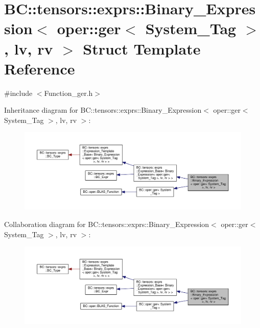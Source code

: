 \hypertarget{structBC_1_1tensors_1_1exprs_1_1Binary__Expression_3_01oper_1_1ger_3_01System__Tag_01_4_00_01lv_00_01rv_01_4}{}\section{BC\+:\+:tensors\+:\+:exprs\+:\+:Binary\+\_\+\+Expression$<$ oper\+:\+:ger$<$ System\+\_\+\+Tag $>$, lv, rv $>$ Struct Template Reference}
\label{structBC_1_1tensors_1_1exprs_1_1Binary__Expression_3_01oper_1_1ger_3_01System__Tag_01_4_00_01lv_00_01rv_01_4}


{\ttfamily \#include $<$Function\+\_\+ger.\+h$>$}



Inheritance diagram for BC\+:\+:tensors\+:\+:exprs\+:\+:Binary\+\_\+\+Expression$<$ oper\+:\+:ger$<$ System\+\_\+\+Tag $>$, lv, rv $>$\+:
\nopagebreak
\begin{figure}[H]
\begin{center}
\leavevmode
\includegraphics[width=350pt]{structBC_1_1tensors_1_1exprs_1_1Binary__Expression_3_01oper_1_1ger_3_01System__Tag_01_4_00_01lv_00_01rv_01_4__inherit__graph}
\end{center}
\end{figure}


Collaboration diagram for BC\+:\+:tensors\+:\+:exprs\+:\+:Binary\+\_\+\+Expression$<$ oper\+:\+:ger$<$ System\+\_\+\+Tag $>$, lv, rv $>$\+:
\nopagebreak
\begin{figure}[H]
\begin{center}
\leavevmode
\includegraphics[width=350pt]{structBC_1_1tensors_1_1exprs_1_1Binary__Expression_3_01oper_1_1ger_3_01System__Tag_01_4_00_01lv_00_01rv_01_4__coll__graph}
\end{center}
\end{figure}
